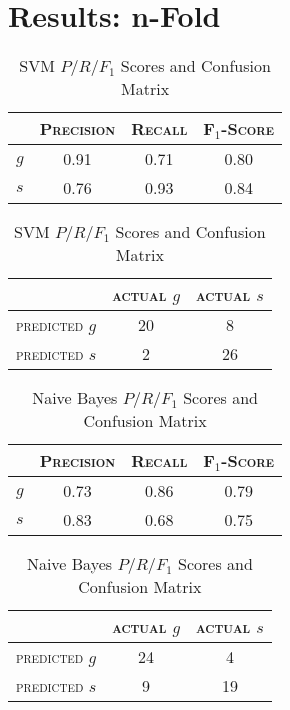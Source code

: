 \section{Results: n-Fold}
\begin{table}[ht]
\begin{minipage}[b]{0.45\linewidth}\centering
\begin{tabular}{ c | c  c  c }
	& \textsc{Precision} & \textsc{Recall} & \textsc{F$_1$-Score} \\
	\hline
	\textsc{$g$} 	& 0.91 & 0.71 & 0.80 \\
	\textsc{$s$}	& 0.76 & 0.93 & 0.84
\end{tabular}
\end{minipage}
\hspace{0.5cm}
\begin{minipage}[b]{0.45\linewidth}
\centering
\begin{tabular}{ c | c  c }
	 & \textsc{actual $g$} & \textsc{actual $s$} \\
	\hline
	\textsc{predicted $g$} 	& 20 & 8 \\
	\textsc{predicted $s$}		& 2 & 26
\end{tabular}
\end{minipage}
\caption{SVM $P/R/F_1$ Scores and Confusion Matrix}
\end{table}

\begin{table}[ht]
\begin{minipage}[b]{0.45\linewidth}\centering
\begin{tabular}{ c | c  c  c }
	& \textsc{Precision} & \textsc{Recall} & \textsc{F$_1$-Score} \\
	\hline
	\textsc{$g$} 	& 0.73 & 0.86 & 0.79 \\
	\textsc{$s$}	& 0.83 & 0.68 & 0.75
\end{tabular}
\end{minipage}
\hspace{0.5cm}
\begin{minipage}[b]{0.45\linewidth}
\centering
\begin{tabular}{ c | c  c }
	 & \textsc{actual $g$} & \textsc{actual $s$} \\
	\hline
	\textsc{predicted $g$} 	& 24 & 4 \\
	\textsc{predicted $s$}		& 9 & 19
\end{tabular}
\end{minipage}
\caption{Naive Bayes $P/R/F_1$ Scores and Confusion Matrix}
\end{table}

